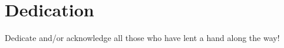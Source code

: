 \center

\section{Dedication}

\vspace*{200pt}

Dedicate and/or acknowledge all those who have lent a hand along the way!

\clearpage